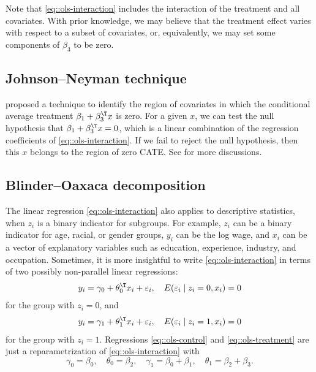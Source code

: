Note that \eqref{eq::ols-interaction} includes the interaction of the treatment and all covariates. With prior knowledge, we may believe that the treatment effect varies with respect to a subset of covariates, or, equivalently, we may set some components of $\beta_3$ to be zero. 


 
 
 \subsection{Johnson--Neyman technique}

\citet{johnson1936tests} proposed a technique to identify the region of covariates in which the conditional average treatment $\beta_1 + \beta_3^{\T} x$ is zero. 
For a given $x$, we can test the null hypothesis that $\beta_1 + \beta_3^{\T} x = 0$, which is a linear combination of the regression coefficients of \eqref{eq::ols-interaction}. If we fail to reject the null hypothesis, then this $x$ belongs to the region of zero CATE. 
See \citet{rogosa1981relationship} for more discussions. 



\subsection{Blinder--Oaxaca decomposition}

The linear regression \eqref{eq::ols-interaction} also applies to descriptive statistics, when $z_i$ is a binary indicator for subgroups. For example, $z_i$ can be a binary indicator for age, racial, or gender groups, $y_i$ can be the log wage, and $x_i$ can be a vector of explanatory variables such as education, experience, industry, and occupation. 
Sometimes, it is more insightful to write \eqref{eq::ols-interaction} in terms of two possibly non-parallel linear regressions:
\begin{eqnarray}
\label{eq::ols-control}
y_i = \gamma_0 + \theta_0^{\T} x_i + \varepsilon_{i}, \quad 
E( \varepsilon_{i} \mid z_i =0, x_i ) = 0
\end{eqnarray}
for the group with $z_i = 0$, and
\begin{eqnarray}
\label{eq::ols-treatment}
y_i = \gamma_1 + \theta_1^{\T} x_i + \varepsilon_{i}, \quad
E( \varepsilon_{i} \mid z_i = 1, x_i ) = 0
\end{eqnarray}
for the group with $z_i = 1$. Regressions \eqref{eq::ols-control} and \eqref{eq::ols-treatment} are just a reparametrization of \eqref{eq::ols-interaction} with
$$
\gamma_0 = \beta_0,\quad
\theta_0 = \beta_2,\quad 
\gamma_1 =\beta_0 + \beta_1,\quad
\theta_1 = \beta_2 + \beta_3 . 
$$

